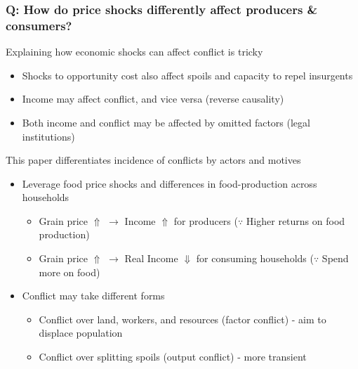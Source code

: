 \documentclass[aspectratio=169]{beamer}
\begin{document}
\begin{frame}
\frametitle{Q: How do price shocks differently affect producers \& consumers?}
Explaining how economic shocks can affect conflict is tricky
\begin{itemize}\setlength\itemsep{3pt}
\item Shocks to opportunity cost also affect spoils and capacity to repel insurgents
\item Income may affect conflict, and vice versa (reverse causality)
\item Both income and conflict may be affected by omitted factors (legal institutions)
\end{itemize}\medskip
This paper differentiates incidence of conflicts by actors and motives 
\begin{itemize}\setlength\itemsep{3pt}
\item Leverage food price shocks and differences in food-production across households
\begin{itemize}\setlength\itemsep{3pt}
  \item Grain price $\Uparrow$ $\to$ Income $\Uparrow$ for producers ($\because$ Higher returns on food production)
  \item Grain price $\Uparrow$ $\to$ Real Income $\Downarrow$ for consuming households ($\because$ Spend more on food)
\end{itemize}
\item Conflict may take different forms
\begin{itemize}\setlength\itemsep{3pt}
  \item Conflict over land, workers, and resources (factor conflict) - aim to displace population
  \item Conflict over splitting spoils (output conflict) - more transient
\end{itemize}
\end{itemize}\medskip
\end{frame}
\end{document}
